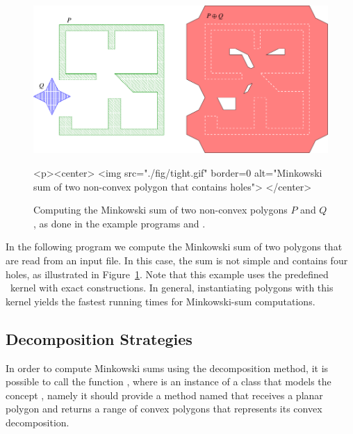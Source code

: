 
\begin{figure}[t]
\begin{ccTexOnly}
  \begin{center}
    \includegraphics{Minkowski_sum_2/fig/tight}
  \end{center}
\end{ccTexOnly}
\begin{ccHtmlOnly}
  <p><center>
  <img src="./fig/tight.gif" border=0 alt="Minkowski sum of two non-convex polygon that contains holes">
  </center>
\end{ccHtmlOnly}
\caption{Computing the Minkowski sum of two non-convex polygons $P$ and $Q$,
as done in the example programs  and
.}
\label{mink_fig:sum_holes}
\end{figure}

In the following program we compute the Minkowski sum of two polygons
that are read from an input file. In this case, the sum is not simple
and contains four holes, as illustrated in Figure~\ref{mink_fig:sum_holes}.
Note that this example uses the predefined \cgal\ kernel with exact
constructions. In general, instantiating polygons with this kernel yields
the fastest running times for Minkowski-sum computations.


\subsection{Decomposition Strategies}
\label{mink_ssec:decomp}

In order to compute Minkowski sums using the decomposition method, it is
possible to call the function , where
 is an instance of a class that models the concept
, namely it should provide a method named
 that receives a planar polygon and returns a range
of convex polygons that represents its convex decomposition.

